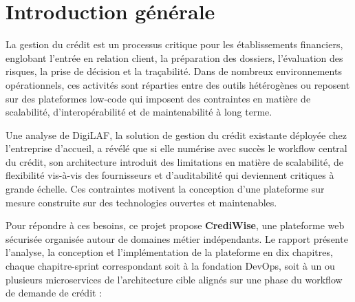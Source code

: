﻿\chapter*{Introduction générale}

La gestion du crédit est un processus critique pour les établissements financiers,
englobant l'entrée en relation client, la préparation des dossiers, l'évaluation des risques,
la prise de décision et la traçabilité. Dans de nombreux environnements opérationnels,
ces activités sont réparties entre des outils hétérogènes ou reposent sur des plateformes
low-code qui imposent des contraintes en matière de scalabilité, d'interopérabilité et
de maintenabilité à long terme.

Une analyse de DigiLAF, la solution de gestion du crédit existante déployée chez
l'entreprise d'accueil, a révélé que si elle numérise avec succès le workflow central du
crédit, son architecture introduit des limitations en matière de scalabilité, de flexibilité
vis-à-vis des fournisseurs et d'auditabilité qui deviennent critiques à grande échelle.
Ces contraintes motivent la conception d'une plateforme sur mesure construite sur des
technologies ouvertes et maintenables.

Pour répondre à ces besoins, ce projet propose \textbf{CrediWise}, une plateforme web sécurisée
organisée autour de domaines métier indépendants. Le rapport présente l'analyse,
la conception et l'implémentation de la plateforme en dix chapitres, chaque chapitre-sprint
correspondant soit à la fondation DevOps, soit à un ou plusieurs microservices
de l'architecture cible alignés sur une phase du workflow de demande de crédit :

